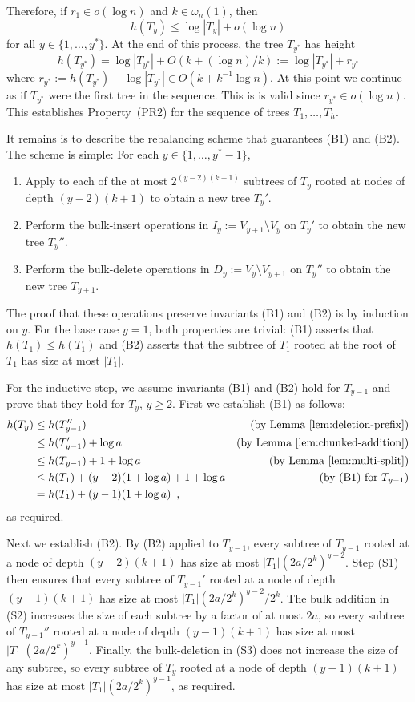 \documentclass[kpfonts]{patmorin}
\begin{document}
Therefore, if $r_1\in o(\log n)$ and $k\in\omega_{n}(1)$, then
\[  h(T_y) \le \log |T_y| + o(\log n) \]
for all $y\in\{1,\ldots,y^*\}$.  At the end of this process, the tree $T_{y^*}$ has height
\[
    h(T_{y^*})= \log |T_{y^*}| + O(k + (\log n)/k) := \log |T_{y^*}| + r_{y^*}
\]
where $r_{y^*}:=h(T_{y^*})-\log|T_{y^*}|\in O(k + k^{-1}\log n)$.  At this point we continue as if $T_{y^*}$ were the first tree in the sequence.  This is is valid since $r_{y^*}\in o(\log n)$.  This establishes Property~(PR2) for the sequence of trees $T_1,\ldots,T_h$.  

It remains is to describe the rebalancing scheme that guarantees (B1) and (B2).  The scheme is simple: For each $y\in\{1,\ldots,y^*-1\}$,
\begin{enumerate}[(S1)]
  \item Apply  to each of the at most $2^{(y-2)(k+1)}$ subtrees of $T_y$ rooted at nodes of depth $(y-2)(k+1)$ to obtain a new tree $T_y'$.
  \item Perform the bulk-insert operations in $I_y:=V_{y+1}\setminus V_y$ on $T_y'$ to obtain the new tree $T_y''$.
  \item Perform the bulk-delete operations in $D_y:=V_{y}\setminus V_{y+1}$ on $T_y''$ to obtain the new tree $T_{y+1}$.
\end{enumerate}

The proof that these operations preserve invariants (B1) and (B2) is by induction on $y$.  For the base case $y=1$, both properties are trivial: (B1) asserts that $h(T_1)\le h(T_1)$ and (B2) asserts that the subtree of $T_1$ rooted at the root of $T_1$ has size at most $|T_1|$.

For the inductive step, we assume invariants (B1) and (B2) hold for $T_{y-1}$ and prove that they hold for $T_{y}$, $y\ge 2$.  First we establish (B1) as follows:
\begin{align*}  
  h(T_y) & \le h(T_{y-1}'') & \text{(by \lemref{deletion-prefix})} \\
          & \le h(T_{y-1}') + \log a & \text{(by \lemref{chunked-addition})} \\
          & \le h(T_{y-1}) + 1 + \log a & \text{(by \lemref{multi-split})} \\
          & \le h(T_1) + (y-2)(1+\log a) + 1 + \log a & \text{(by (B1) for $T_{y-1}$)}\\
          & = h(T_1) + (y-1)(1+\log a) \enspace ,
\end{align*}
as required.

Next we establish (B2).  By (B2) applied to $T_{y-1}$, every subtree of $T_{y-1}$ rooted at a node of depth $(y-2)(k+1)$ has size at most $|T_{1}|(2a/2^k)^{y-2}$.  Step (S1) then ensures that every subtree of $T_{y-1}'$ rooted at a node of depth $(y-1)(k+1)$ has size at most $|T_{1}|(2a/2^k)^{y-2}/2^k$.  The bulk addition in (S2) increases the size of each subtree by a factor of at most $2a$, so every subtree of $T_{y-1}''$ rooted at a node of depth $(y-1)(k+1)$ has size at most $|T_{1}|(2a/2^k)^{y-1} $.
Finally, the bulk-deletion in (S3) does not increase the size of any subtree, so every subtree of $T_{y}$ rooted at a node of depth $(y-1)(k+1)$ has size at most $|T_{1}|(2a/2^k)^{y-1}$, as required.
\end{document}
